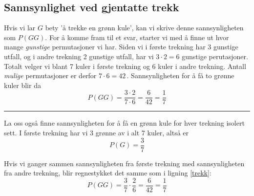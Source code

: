 \subsection{Sannsynlighet ved gjentatte trekk}
 \qquad
{}
Hvis vi lar $ G $ bety 'å trekke en grønn kule', kan vi skrive denne sannsynligheten som $ P(GG) $. For å komme fram til et svar, starter vi med å finne ut hvor mange \textsl{gunstige} permutasjoner vi har. Siden vi i første trekning har 3 gunstige utfall, og i andre trekning 2 gunstige utfall, har vi $3\cdot2=6$ gunstige perutasjoner. Totalt velger vi blant 7 kuler i første trekning og 6 kuler i andre trekning. Antall \textsl{mulige} permutasjoner er derfor $7\cdot6=42$\,. Sannsynligheten for å få to grønne kuler blir da
\begin{equation}
P(GG)=\frac{3\cdot2}{7\cdot6}=\frac{6}{42}=\frac{1}{7} \label{trekk}
\end{equation}
\rule{\linewidth}{1pt}
La oss også finne sannsynligheten for å få en grønn kule for hver trekning isolert sett. I første trekning har vi 3 grønne av i alt 7 kuler, altså er
\[ P(G)=\frac{3}{7} \]
\qquad
{}


Hvis vi ganger sammen sannsynligheten fra første trekning med sannsynligheten fra andre trekning, blir regnestykket det samme som i ligning \eqref{trekk}:
\[ P(GG)=\frac{3}{7}\cdot\frac{2}{6}=\frac{6}{42}=\frac{1}{7} \]


